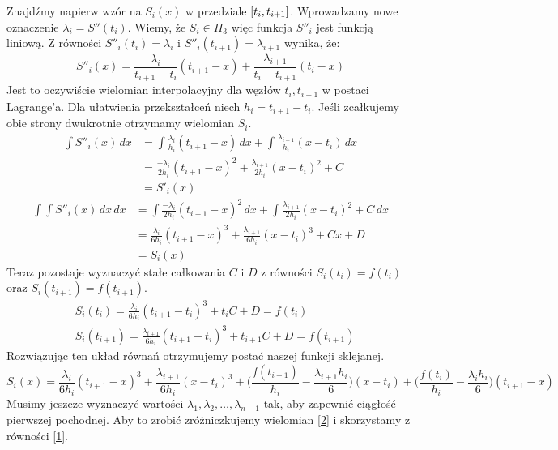 \documentclass[a4paper]{article}
\begin{document}
    Znajdźmy napierw wzór na $S_i(x)$ w przedziale $\interval[]{t_i}{t_{i+1}}$. Wprowadzamy nowe oznaczenie $\lambda_i = S''(t_i)$.
    \newline Wiemy, że $S_i \in \Pi_3$ więc funkcja $S''_i$ jest funkcją liniową. Z równości $S''_i(t_i) = \lambda_i$ i $S''_i(t_{i+1}) = \lambda_{i+1}$ wynika, że:
    \[
          S''_i(x) = \frac{\lambda_i}{t_{i+1} - t_i}(t_{i+1} - x) + \frac{\lambda_{i+1}}{t_i - t_{i+1}}(t_i - x)
    \]
    Jest to oczywiście wielomian interpolacyjny dla węzłów $t_i, t_{i+1}$ w postaci Lagrange'a. Dla ułatwienia przekształceń niech $h_i = t_{i+1} - t_i$. 
    Jeśli zcałkujemy obie strony dwukrotnie otrzymamy wielomian $S_i$.
    \[
        \begin{split}
            \int S''_i(x) \, dx  & = \int \frac{\lambda_i}{h_i}(t_{i+1} - x) \, dx + \int \frac{\lambda_{i+1}}{h_i}(x - t_i) \, dx \\
                                 & = \frac{-\lambda_i}{2h_i}(t_{i+1} - x)^2 + \frac{\lambda_{i+1}}{2h_i}(x - t_i)^2 + C \\
                                 & = S'_i(x)
        \end{split}
    \]
    \[
        \begin{split}
            \int \int S''_i(x) \, dx \, dx & = \int \frac{-\lambda_i}{2h_i}(t_{i+1} - x)^2 \, dx + \int \frac{\lambda_{i+1}}{2h_i}(x - t_i)^2 + C \, dx \\
                                           & = \frac{\lambda_i}{6h_i}(t_{i+1} - x)^3 + \frac{\lambda_{i+1}}{6h_i}(x - t_i)^3 + Cx + D \\
                                           & = S_i(x)
        \end{split}  
    \]
    Teraz pozostaje wyznaczyć stałe całkowania $C$ i $D$ z równości $S_i(t_i) = f(t_i)$ oraz $S_i(t_{i+1}) = f(t_{i+1})$.
    \[
        \begin{aligned}
            & S_i(t_i) = \frac{\lambda_i}{6h_i}(t_{i+1} - t_i)^3 + t_iC + D = f(t_i) \\
            & S_i(t_{i+1}) = \frac{\lambda_{i+1}}{6h_i}(t_{i+1} - t_i)^3 + t_{i+1}C + D = f(t_{i+1})
        \end{aligned}
    \]
    Rozwiązując ten układ równań otrzymujemy postać naszej funkcji sklejanej.
    \begin{equation}
        \label{2}
        S_i(x) = \frac{\lambda_i}{6h_i}(t_{i+1} - x)^3 + \frac{\lambda_{i+1}}{6h_i}(x - t_i)^3 + 
        \bigg(\frac{f(t_{i+1})}{h_i} - \frac{\lambda_{i+1}h_i}{6}\bigg)(x - t_i) +
        \bigg(\frac{f(t_{i})}{h_i} - \frac{\lambda_ih_i}{6}\bigg)(t_{i+1} - x)
    \end{equation}
    Musimy jeszcze wyznaczyć wartości $\lambda_1, \lambda_2, \dotsc, \lambda_{n-1}$ tak, aby zapewnić ciągłość pierwszej pochodnej.
    Aby to zrobić zróżniczkujemy wielomian \eqref{2} i skorzystamy z równości \eqref{1}.
\end{document}
